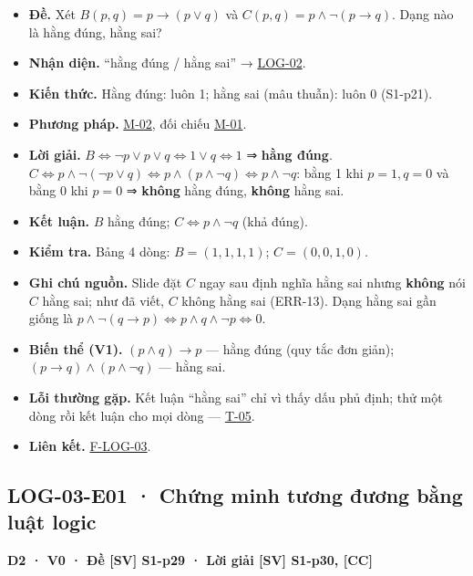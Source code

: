 \documentclass[
  10pt,
  twoside,openany]{book}
\providecommand{\tightlist}{%
  \setlength{\itemsep}{0pt}\setlength{\parskip}{0pt}}
\begin{document}
\begin{itemize}
\tightlist
\item
  \textbf{Đề.} Xét \(B(p,q)=p\to(p\vee q)\) và
  \(C(p,q)=p\wedge\neg(p\to q)\). Dạng nào là hằng đúng, hằng sai?
\item
  \textbf{Nhận diện.} ``hằng đúng / hằng sai'' →
  \protect\hyperlink{LOG-02}{LOG-02}.
\item
  \textbf{Kiến thức.} Hằng đúng: luôn 1; hằng sai (mâu thuẫn): luôn 0
  (S1-p21).
\item
  \textbf{Phương pháp.} \protect\hyperlink{M-02}{M-02}, đối chiếu
  \protect\hyperlink{M-01}{M-01}.
\item
  \textbf{Lời giải.}
  \(B\Leftrightarrow\neg p\vee p\vee q\Leftrightarrow1\vee q\Leftrightarrow1\)
  ⇒ \textbf{hằng đúng}.
  \(C\Leftrightarrow p\wedge\neg(\neg p\vee q)\Leftrightarrow p\wedge(p\wedge\neg q)\Leftrightarrow p\wedge\neg q\):
  bằng 1 khi \(p=1,q=0\) và bằng 0 khi \(p=0\) ⇒ \textbf{không} hằng
  đúng, \textbf{không} hằng sai.
\item
  \textbf{Kết luận.} \(B\) hằng đúng; \(C\Leftrightarrow p\wedge\neg q\)
  (khả đúng).
\item
  \textbf{Kiểm tra.} Bảng 4 dòng: \(B=(1,1,1,1)\); \(C=(0,0,1,0)\).
\item
  \textbf{Ghi chú nguồn.} Slide đặt \(C\) ngay sau định nghĩa hằng sai
  nhưng \textbf{không} nói \(C\) hằng sai; như đã viết, \(C\) không hằng
  sai (ERR-13). Dạng hằng sai gần giống là
  \(p\wedge\neg(q\to p)\Leftrightarrow p\wedge q\wedge\neg p\Leftrightarrow0\).
\item
  \textbf{Biến thể (V1).} \((p\wedge q)\to p\) --- hằng đúng (quy tắc
  đơn giản); \((p\to q)\wedge(p\wedge\neg q)\) --- hằng sai.
\item
  \textbf{Lỗi thường gặp.} Kết luận ``hằng sai'' chỉ vì thấy dấu phủ
  định; thử một dòng rồi kết luận cho mọi dòng ---
  \protect\hyperlink{T-05}{T-05}.
\item
  \textbf{Liên kết.} \protect\hyperlink{F-LOG-03}{F-LOG-03}.
\end{itemize}

\hypertarget{LOG-03-E01}{%
\subsection{LOG-03-E01 · Chứng minh tương đương bằng luật
logic}\label{LOG-03-E01}}

\textbf{D2 · V0 · Đề {[}SV{]} S1-p29 · Lời giải {[}SV{]} S1-p30,
{[}CC{]}}
\end{document}
